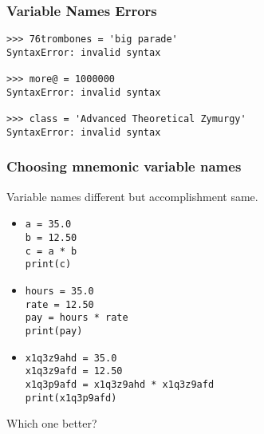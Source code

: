\begin{frame}[fragile]\frametitle{Variable Names Errors}
\begin{lstlisting}
>>> 76trombones = 'big parade'
SyntaxError: invalid syntax

>>> more@ = 1000000
SyntaxError: invalid syntax

>>> class = 'Advanced Theoretical Zymurgy'
SyntaxError: invalid syntax
\end{lstlisting}
\end{frame} 
\begin{frame}[fragile]\frametitle{Choosing mnemonic variable names}
Variable names different but accomplishment same.
  \begin{itemize}
  \item 
\begin{lstlisting}
a = 35.0
b = 12.50
c = a * b
print(c)
\end{lstlisting}

\item

\begin{lstlisting}
hours = 35.0
rate = 12.50
pay = hours * rate
print(pay)
\end{lstlisting}

\item

\begin{lstlisting}
x1q3z9ahd = 35.0
x1q3z9afd = 12.50
x1q3p9afd = x1q3z9ahd * x1q3z9afd
print(x1q3p9afd)
\end{lstlisting}
  \end{itemize}
Which one better?
\end{frame} 

